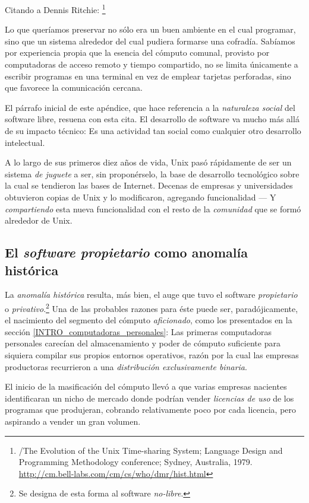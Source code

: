 \documentclass[11pt,fleqn]{book} %
\begin{document}
Citando a Dennis Ritchie: \footnote{/The Evolution of the Unix
Time-sharing System; Language Design and Programming Methodology
conference; Sydney,
Australia, 1979. \href{http://cm.bell-labs.com/cm/cs/who/dmr/hist.html}{http://cm.bell-labs.com/cm/cs/who/dmr/hist.html} }

\begin{center}
Lo que queríamos preservar no sólo era un buen ambiente en el cual
programar, sino que un sistema alrededor del cual pudiera formarse una
cofradía. Sabíamos por experiencia propia que la esencia del cómputo
comunal, provisto por computadoras de acceso remoto y tiempo
compartido, no se limita únicamente a escribir programas en una
terminal en vez de emplear tarjetas perforadas, sino que favorece la
comunicación cercana.
\end{center}

El párrafo inicial de este apéndice, que hace referencia a la
\emph{naturaleza social} del software libre, resuena con esta cita. El
desarrollo de software va mucho más allá de su impacto técnico: Es una
actividad tan social como cualquier otro desarrollo intelectual.

A lo largo de sus primeros diez años de vida, Unix pasó rápidamente de
ser un sistema \emph{de juguete} a ser, sin proponérselo, la base de
desarrollo tecnológico sobre la cual se tendieron las bases de
Internet. Decenas de empresas y universidades obtuvieron copias de
Unix y lo modificaron, agregando funcionalidad — Y \emph{compartiendo} esta
nueva funcionalidad con el resto de la \emph{comunidad} que se formó
alrededor de Unix.
\subsection{El \emph{software propietario} como anomalía histórica}
\label{sec-8-1-3}


La \emph{anomalía histórica} resulta, más bien, el auge que tuvo el
software \emph{propietario} o \emph{privativo}.\footnote{Se designa de esta forma al
software \emph{no-libre}. } Una de las probables razones para éste puede
ser, paradójicamente, el nacimiento del segmento del cómputo
\emph{aficionado}, como los presentados en la sección
\ref{INTRO_computadoras_personales}: Las primeras computadoras
personales carecían del almacenamiento y poder de cómputo suficiente
para siquiera compilar sus propios entornos operativos, razón por la
cual las empresas productoras recurrieron a una \emph{distribución exclusivamente binaria}.

El inicio de la masificación del cómputo llevó a que varias empresas
nacientes identificaran un nicho de mercado donde podrían vender
\emph{licencias de uso} de los programas que produjeran, cobrando
relativamente poco por cada licencia, pero aspirando a vender un gran
volumen.
\end{document}
